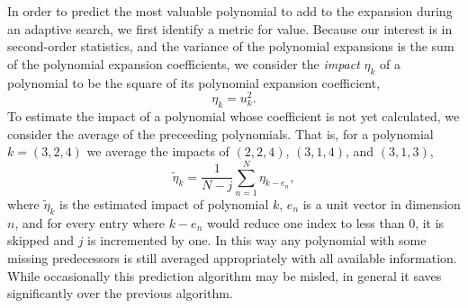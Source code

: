 In order to predict the most valuable polynomial to add to the expansion during an adaptive search, we first
identify a metric for value.  Because our interest is in second-order statistics, and the variance of the
polynomial expansions is the sum of the polynomial expansion coefficients, we consider the \emph{impact}
$\eta_k$ of a polynomial to be the square of its polynomial expansion coefficient,
\begin{equation}
  \eta_k = u_k^2.
\end{equation}
To estimate the impact of a polynomial whose coefficient is not yet calculated, we consider the average of the
preceeding polynomials.  That is, for a polynomial $k=(3,2,4)$ we average the impacts of $(2,2,4)$, $(3,1,4)$,
and $(3,1,3)$,
\begin{equation}
  \tilde \eta_k = \frac{1}{N-j}\sum_{n=1}^N \eta_{k-e_n},
\end{equation}
where $\tilde \eta_k$ is the estimated impact of polynomial $k$, $e_n$ is a unit vector in dimension $n$, and
for every entry where $k-e_n$ would reduce one index to less than 0, it is skipped and $j$ is incremented by
one.  In this way any polynomial with some missing predecessors is still averaged appropriately with all
available information.  While occasionally this prediction algorithm may be misled, in general it saves
significantly over the previous algorithm.

